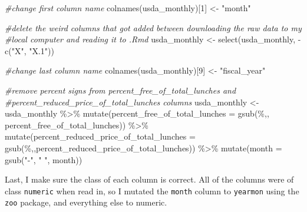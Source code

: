 \documentclass[
]{article}
\newenvironment{Shaded}{\begin{snugshade}}{\end{snugshade}}
\newcommand{\AttributeTok}[1]{\textcolor[rgb]{0.77,0.63,0.00}{#1}}
\newcommand{\CommentTok}[1]{\textcolor[rgb]{0.56,0.35,0.01}{\textit{#1}}}
\newcommand{\DecValTok}[1]{\textcolor[rgb]{0.00,0.00,0.81}{#1}}
\newcommand{\FunctionTok}[1]{\textcolor[rgb]{0.00,0.00,0.00}{#1}}
\newcommand{\NormalTok}[1]{#1}
\newcommand{\OtherTok}[1]{\textcolor[rgb]{0.56,0.35,0.01}{#1}}
\newcommand{\SpecialCharTok}[1]{\textcolor[rgb]{0.00,0.00,0.00}{#1}}
\newcommand{\StringTok}[1]{\textcolor[rgb]{0.31,0.60,0.02}{#1}}
\begin{document}
\begin{Shaded}
\begin{Highlighting}[]
\CommentTok{\#change first column name }
\FunctionTok{colnames}\NormalTok{(usda\_monthly)[}\DecValTok{1}\NormalTok{] }\OtherTok{\textless{}{-}} \StringTok{"month"}

\CommentTok{\#delete the weird columns that got added between downloading the raw data to my }
\CommentTok{\#local computer and reading it to .Rmd}
\NormalTok{usda\_monthly }\OtherTok{\textless{}{-}} \FunctionTok{select}\NormalTok{(usda\_monthly, }\SpecialCharTok{{-}}\FunctionTok{c}\NormalTok{(}\StringTok{"X"}\NormalTok{, }\StringTok{"X.1"}\NormalTok{))}

\CommentTok{\#change last column name}
\FunctionTok{colnames}\NormalTok{(usda\_monthly)[}\DecValTok{9}\NormalTok{] }\OtherTok{\textless{}{-}} \StringTok{"fiscal\_year"}
\end{Highlighting}
\end{Shaded}

\begin{Shaded}
\begin{Highlighting}[]
\CommentTok{\#remove percent signs from percent\_free\_of\_total\_lunches and }
\CommentTok{\#percent\_reduced\_price\_of\_total\_lunches columns}
\NormalTok{usda\_monthly }\OtherTok{\textless{}{-}}\NormalTok{ usda\_monthly }\SpecialCharTok{\%\textgreater{}\%} 
 \FunctionTok{mutate}\NormalTok{(}\AttributeTok{percent\_free\_of\_total\_lunches =} \FunctionTok{gsub}\NormalTok{(}\StringTok{\textquotesingle{}\%\textquotesingle{}}\NormalTok{,}\StringTok{\textquotesingle{}\textquotesingle{}}\NormalTok{, percent\_free\_of\_total\_lunches)) }\SpecialCharTok{\%\textgreater{}\%} 
  \FunctionTok{mutate}\NormalTok{(}\AttributeTok{percent\_reduced\_price\_of\_total\_lunches =} \FunctionTok{gsub}\NormalTok{(}\StringTok{\textquotesingle{}\%\textquotesingle{}}\NormalTok{,}\StringTok{\textquotesingle{}\textquotesingle{}}\NormalTok{,percent\_reduced\_price\_of\_total\_lunches)) }\SpecialCharTok{\%\textgreater{}\%}
  \FunctionTok{mutate}\NormalTok{(}\AttributeTok{month =} \FunctionTok{gsub}\NormalTok{(}\StringTok{"{-}"}\NormalTok{, }\StringTok{" "}\NormalTok{, month))}
\end{Highlighting}
\end{Shaded}

Last, I make sure the class of each column is correct. All of the
columns were of class \texttt{numeric} when read in, so I mutated the
\texttt{month} column to \texttt{yearmon} using the \texttt{zoo}
package, and everything else to numeric.
\end{document}
